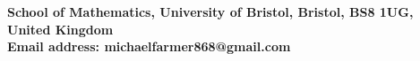 \documentclass[a4paper,12.5pt]{amsart}
\theoremstyle{definition}
\theoremstyle{remark}
\newtheorem*{rem}{Remark}
\begin{document}
        
                  
                
                

 
  \textbf{School of Mathematics, University of Bristol, Bristol, BS8 1UG, United Kingdom }
  \\
 \textbf{Email address: michaelfarmer868@gmail.com}
               
     
 
\end{document}
